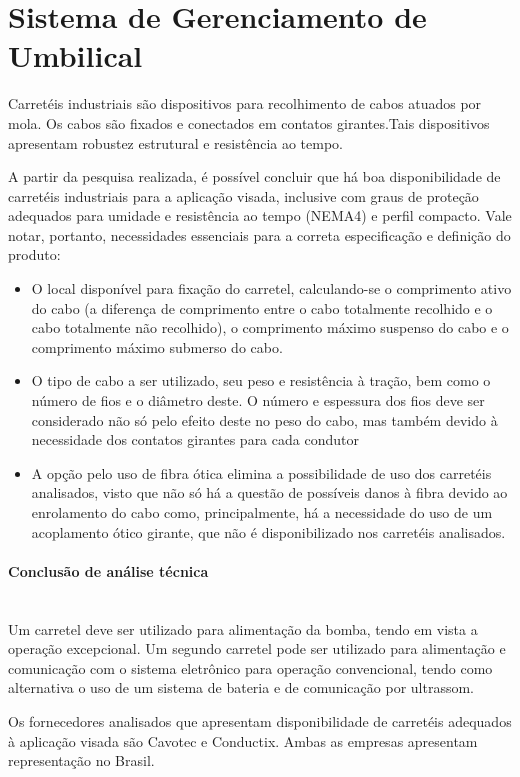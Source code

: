 \section{Sistema de Gerenciamento de Umbilical}

Carretéis industriais são dispositivos para recolhimento de cabos atuados por mola. Os cabos são fixados e conectados em contatos girantes.Tais dispositivos apresentam robustez estrutural e resistência ao tempo.
 
A partir da pesquisa realizada, é possível concluir que há boa disponibilidade de carretéis industriais para a aplicação visada, inclusive com graus de proteção adequados para umidade e resistência ao tempo (NEMA4) e perfil compacto. Vale notar, portanto, necessidades essenciais para a correta especificação e definição do produto:
\begin{itemize}
  \item O local disponível para fixação do carretel, calculando-se o comprimento ativo do cabo (a diferença de comprimento entre o cabo totalmente recolhido e o cabo totalmente não recolhido), o comprimento máximo suspenso do cabo e o comprimento máximo submerso do cabo.
  
  \item O tipo de cabo a ser utilizado, seu peso e resistência à tração, bem como o número de fios e o diâmetro deste. O número e espessura dos fios deve ser considerado não só pelo efeito deste no peso do cabo, mas também devido à necessidade dos contatos girantes para cada condutor
 
  \item A opção pelo uso de fibra ótica elimina a possibilidade de uso dos carretéis analisados, visto que não só há a questão de possíveis danos à fibra devido ao enrolamento do cabo como, principalmente, há a necessidade do uso de um acoplamento ótico girante, que não é disponibilizado nos carretéis analisados.
\end{itemize}
\paragraph{Conclusão de análise técnica}\mbox{}\\
 
Um carretel deve ser utilizado para alimentação da bomba, tendo em vista a operação excepcional. Um segundo carretel pode ser utilizado para alimentação e comunicação com o sistema eletrônico para operação convencional, tendo como alternativa o uso de um sistema de bateria e de comunicação por ultrassom.
 
Os fornecedores analisados que apresentam disponibilidade de carretéis adequados à aplicação visada são Cavotec e Conductix. Ambas as empresas apresentam representação no Brasil.
 